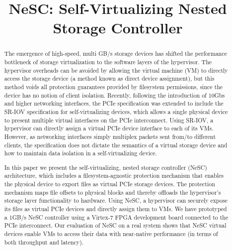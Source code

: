 \documentclass[10pt,final,conference]{IEEEtran}
\title{NeSC: Self-Virtualizing Nested Storage Controller}
\author{
\IEEEauthorblockN{Yonatan Gottesman}
\IEEEauthorblockA{Electrical Engineering\\
  Technion --- Israel Institute of Technology\\
  yoni@tce.technion.ac.il}
\and
\IEEEauthorblockN{Yoav Etsion}
\IEEEauthorblockA{Electrical Engineering and Computer Science\\
  Technion --- Israel Institute of Technology\\
  yetsion@tce.technion.ac.il}
}
\begin{document}
\maketitle
\pagestyle{plain}

\begin{abstract}
The emergence of high-speed, multi GB/s storage devices has shifted the performance bottleneck of storage virtualization to the software layers of the hypervisor. The hypervisor overheads can be avoided by allowing the virtual machine (VM) to directly access the storage device (a method known as direct device assignment), but this method voids all protection guarantees provided by  filesystem permissions, since the device has no notion of client isolation.
Recently, following the introduction of 10Gbs and higher networking interfaces, the PCIe specification was extended to include the SR-IOV specification for self-virtualizing devices, which allows a single physical device to present multiple virtual interfaces on the PCIe interconnect. Using SR-IOV, a hypervisor can directly assign a virtual PCIe device interface to each of its VMs. However, as networking interfaces simply multiplex packets sent from/to different clients, the specification does not dictate the semantics of a virtual storage device and how to maintain data isolation in a self-virtualizing device.



  In this paper we present the self-virtualizing, nested storage controller (NeSC) architecture, which includes a filesystem-agnostic protection mechanism that enables the physical device to export files as virtual PCIe storage devices. The protection mechanism maps file offsets to physical blocks and thereby offloads the hypervisor's storage layer functionality to hardware.
  Using NeSC, a hypervisor can securely expose its files as virtual PCIe devices and directly assign them to VMs.
  We have prototyped a 1GB/s NeSC controller using a Virtex-7 FPGA development board connected to the PCIe interconnect. 
  Our evaluation of NeSC on a real system shows that NeSC virtual devices enable VMs to access their data with near-native performance (in terms of both throughput and latency).
\end{abstract}


















\end{document}
